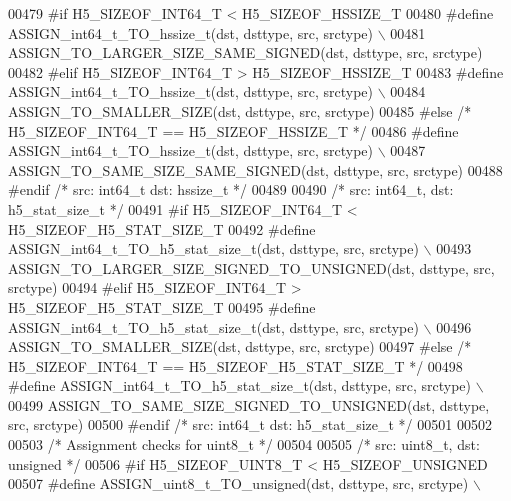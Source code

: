 \begin{DoxyCode}
00479 \textcolor{preprocessor}{#if H5\_SIZEOF\_INT64\_T < H5\_SIZEOF\_HSSIZE\_T}
00480 \textcolor{preprocessor}{    #define ASSIGN\_int64\_t\_TO\_hssize\_t(dst, dsttype, src, srctype) \(\backslash\)}
00481 \textcolor{preprocessor}{        ASSIGN\_TO\_LARGER\_SIZE\_SAME\_SIGNED(dst, dsttype, src, srctype)}
00482 \textcolor{preprocessor}{#elif H5\_SIZEOF\_INT64\_T > H5\_SIZEOF\_HSSIZE\_T}
00483 \textcolor{preprocessor}{    #define ASSIGN\_int64\_t\_TO\_hssize\_t(dst, dsttype, src, srctype) \(\backslash\)}
00484 \textcolor{preprocessor}{        ASSIGN\_TO\_SMALLER\_SIZE(dst, dsttype, src, srctype)}
00485 \textcolor{preprocessor}{#else }\textcolor{comment}{/* H5\_SIZEOF\_INT64\_T == H5\_SIZEOF\_HSSIZE\_T */}\textcolor{preprocessor}{}
00486 \textcolor{preprocessor}{    #define ASSIGN\_int64\_t\_TO\_hssize\_t(dst, dsttype, src, srctype) \(\backslash\)}
00487 \textcolor{preprocessor}{        ASSIGN\_TO\_SAME\_SIZE\_SAME\_SIGNED(dst, dsttype, src, srctype)}
00488 \textcolor{preprocessor}{#endif }\textcolor{comment}{/* src: int64\_t dst: hssize\_t */}\textcolor{preprocessor}{}
00489 
00490 \textcolor{comment}{/* src: int64\_t, dst: h5\_stat\_size\_t */}
00491 \textcolor{preprocessor}{#if H5\_SIZEOF\_INT64\_T < H5\_SIZEOF\_H5\_STAT\_SIZE\_T}
00492 \textcolor{preprocessor}{    #define ASSIGN\_int64\_t\_TO\_h5\_stat\_size\_t(dst, dsttype, src, srctype) \(\backslash\)}
00493 \textcolor{preprocessor}{        ASSIGN\_TO\_LARGER\_SIZE\_SIGNED\_TO\_UNSIGNED(dst, dsttype, src, srctype)}
00494 \textcolor{preprocessor}{#elif H5\_SIZEOF\_INT64\_T > H5\_SIZEOF\_H5\_STAT\_SIZE\_T}
00495 \textcolor{preprocessor}{    #define ASSIGN\_int64\_t\_TO\_h5\_stat\_size\_t(dst, dsttype, src, srctype) \(\backslash\)}
00496 \textcolor{preprocessor}{        ASSIGN\_TO\_SMALLER\_SIZE(dst, dsttype, src, srctype)}
00497 \textcolor{preprocessor}{#else }\textcolor{comment}{/* H5\_SIZEOF\_INT64\_T == H5\_SIZEOF\_H5\_STAT\_SIZE\_T */}\textcolor{preprocessor}{}
00498 \textcolor{preprocessor}{    #define ASSIGN\_int64\_t\_TO\_h5\_stat\_size\_t(dst, dsttype, src, srctype) \(\backslash\)}
00499 \textcolor{preprocessor}{        ASSIGN\_TO\_SAME\_SIZE\_SIGNED\_TO\_UNSIGNED(dst, dsttype, src, srctype)}
00500 \textcolor{preprocessor}{#endif }\textcolor{comment}{/* src: int64\_t dst: h5\_stat\_size\_t */}\textcolor{preprocessor}{}
00501 
00502 
00503 \textcolor{comment}{/* Assignment checks for uint8\_t */}
00504 
00505 \textcolor{comment}{/* src: uint8\_t, dst: unsigned */}
00506 \textcolor{preprocessor}{#if H5\_SIZEOF\_UINT8\_T < H5\_SIZEOF\_UNSIGNED}
00507 \textcolor{preprocessor}{    #define ASSIGN\_uint8\_t\_TO\_unsigned(dst, dsttype, src, srctype) \(\backslash\)}

\end{DoxyCode}
